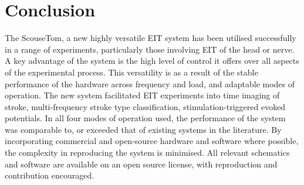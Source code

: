 \section{Conclusion}
The ScouseTom, a new highly versatile EIT system has been utilised successfully in a range of experiments, particularly those involving EIT of the head or nerve. A key advantage of the system is the high level of control it offers over all aspects of the experimental process. This versatility is as a result of the stable performance of the hardware across frequency and load, and adaptable modes of operation. The new system facilitated EIT experiments into time imaging of stroke, multi-frequency stroke type classification, stimulation-triggered evoked potentials. In all four modes of operation used, the performance of the system was comparable to, or exceeded that of existing systems in the literature. By incorporating commercial and open-source hardware and software where possible, the complexity in reproducing the system is minimised. All relevant schematics and software are available on an open source license, with reproduction and contribution encouraged. 